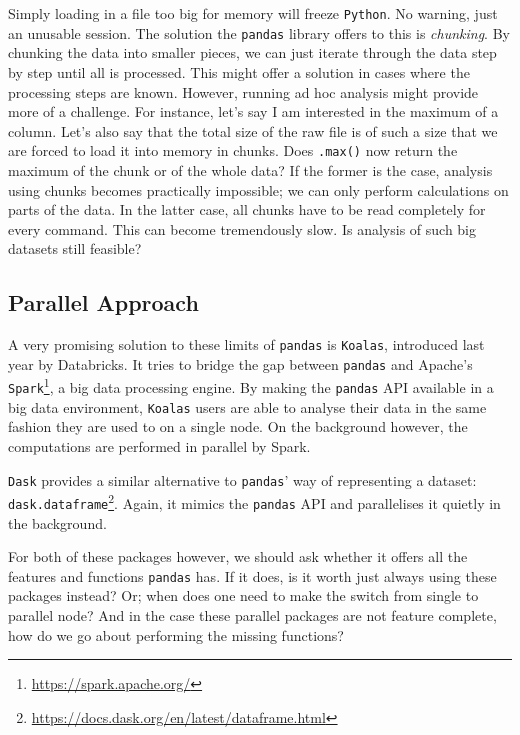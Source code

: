 Simply loading in a file too big for memory will freeze \texttt{Python}. No warning, just an unusable session. The solution the \texttt{pandas} library offers to this is \textit{chunking}. By chunking the data into smaller pieces, we can just iterate through the data step by step until all is processed. This might offer a solution in cases where the processing steps are known. However, running ad hoc analysis might provide more of a challenge. For instance, let's say I am interested in the maximum of a column. Let's also say that the total size of the raw file is of such a size that we are forced to load it into memory in chunks. Does \texttt{.max()} now return the maximum of the chunk or of the whole data? If the former is the case, analysis using chunks becomes practically impossible; we can only perform calculations on parts of the data. In the latter case, all chunks have to be read completely for every command. This can become tremendously slow. Is analysis of such big datasets still feasible?

\subsection{Parallel Approach}

A very promising solution to these limits of \texttt{pandas} is \texttt{Koalas}, introduced last year by Databricks\cite{koalas_announced}. It tries to bridge the gap between \texttt{pandas} and Apache's \texttt{Spark}\footnote{\url{https://spark.apache.org/}}, a big data processing engine. By making the \texttt{pandas} API available in a big data environment, \texttt{Koalas} users are able to analyse their data in the same fashion they are used to on a single node. On the background however, the computations are performed in parallel by Spark.

\texttt{Dask} provides a similar alternative to \texttt{pandas}' way of representing a dataset: \texttt{dask.dataframe}\footnote{\url{https://docs.dask.org/en/latest/dataframe.html}}. Again, it mimics the \texttt{pandas} API and parallelises it quietly in the background.

For both of these packages however, we should ask whether it offers all the features and functions \texttt{pandas} has. If it does, is it worth just always using these packages instead? Or; when does one need to make the switch from single to parallel node? And in the case these parallel packages are not feature complete, how do we go about performing the missing functions?

